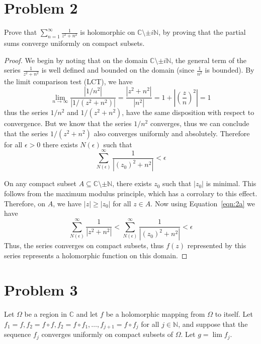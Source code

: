 \documentclass{article}[12pt]
\def\CC{{\mathbb C}}
\def\NN{{\mathbb N}}
\begin{document}
\section*{Problem 2} Prove that $\sum_{n=1}^\infty \frac{1}{z^2+n^2}$ is
holomorphic on $\CC\setminus \pm i\NN$, by proving that
the partial sums converge uniformly on compact subsets.
\begin{proof}
We begin by noting that on the domain $\CC\setminus \pm i\NN$, the 
general term of the series $\frac{1}{z^2+n^2}$ is well defined and
bounded on the domain (since $\frac{1}{n^2}$ is bounded). By the
limit comparison test (LCT), we have
\[
\lim_{n\to\infty} \frac{|1/n^2|}{|1/(z^2+n^2)|} = \frac{|z^2+n^2|}{|n^2|}
= 1 + |(\frac{z}{n})^2| = 1
\]
thus the series $1/n^2$ and $1/(z^2+n^2)$, have the same disposition with
respect to convergence. But we know that the series $1/n^2$ converges, thus
we can conclude that the series $1/(z^2+n^2)$ also converges
uniformly and absolutely. Therefore for all $\epsilon>0$ there exists
$N(\epsilon)$ such that
\begin{equation}
\sum_{N(\epsilon)}^\infty \frac{1}{|(z_0)^2+n^2|} < \epsilon \label{eqn:2a}
\end{equation}

On any compact subset $A\subseteq \CC\setminus \pm\NN$, there exists
$z_0$ such that $|z_0|$ is minimal. This follows from the maximum modulus
principle, which has a corrolary to this effect. Therefore, on $A$, we have
$|z|\ge |z_0|$ for all $z\in A$. Now using Equation~\ref{eqn:2a} we have
\[
\sum_{N(\epsilon)}^\infty \frac{1}{|z^2+n^2|} < \sum_{N(\epsilon)}^\infty \frac{1}{|(z_0)^2+n^2|} < \epsilon \label{eqn:2b}
\]
Thus, the series converges on compact subsets, thus $f(z)$ represented
by this series represents a holomorphic function on this domain.
\end{proof}


\section*{Problem 3}
Let $\Omega$ be a region in $\CC$ and let $f$ be a holomorphic mapping
from $\Omega$ to itself. 
Let $f_1=f, f_2=f\circ f, f_2 = f\circ f_1,\ldots,f_{j+1}=f\circ f_j$ for
all $j\in \NN$, and suppose that the sequence $f_j$ converges
uniformly on compact subsets of $\Omega$. Let $g=\lim f_j$.
\end{document}
